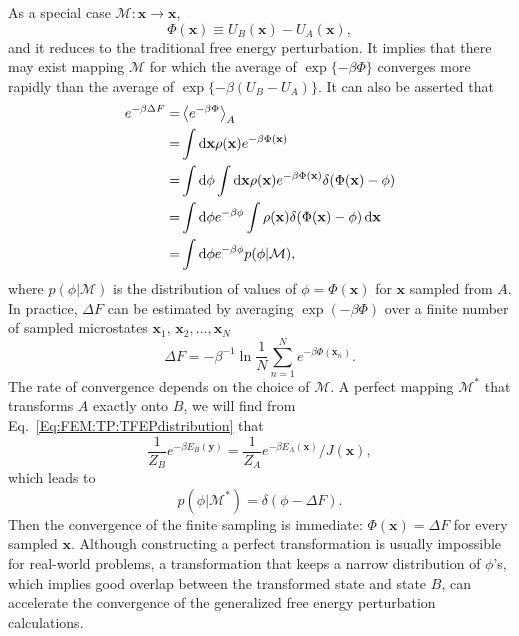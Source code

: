 As a special case $\mathcal{M}: \mathbf{x} \to\mathbf{x}$,
\begin{equation}
	\Phi(\mathbf{x})\equiv U_B(\mathbf{x})-U_A(\mathbf{x}),
\end{equation}
and it reduces to the traditional free energy perturbation. It implies that there may exist mapping $\mathcal{M}$ for which the average of $\exp\{-\beta \Phi\}$ converges more rapidly than the average of $\exp\{-\beta (U_B-U_A)\}$. It can also be asserted that
\begin{align}
	e^{-\beta \Delta F}=&\left<e^{-\beta \Phi}\right>_A\notag\\
	                =&\int \mathop{}\!\mathrm{d} \mathbf{x} \rho(\mathbf{x})e^{-\beta \Phi(\mathbf{x})}\notag\\
	                =&\int \mathop{}\!\mathrm{d}\phi \int \mathop{}\!\mathrm{d} \mathbf{x} \rho(\mathbf{x})e^{-\beta \Phi(\mathbf{x})}\delta(\Phi(\mathbf{x})-\phi)\notag\\
	                =&\int \mathop{}\!\mathrm{d}\phi e^{-\beta \phi}\int \rho(\mathbf{x})\delta(\Phi(\mathbf{x})-\phi)\mathop{}\!\mathrm{d} \mathbf{x}\notag\\
	                =&\int \mathop{}\!\mathrm{d}\phi e^{-\beta \phi} p(\phi|\mathcal{M}),
\end{align}
where $p(\phi|\mathcal{M})$ is the distribution of values of $\phi=\Phi(\mathbf{x})$ for $\mathbf{x}$ sampled from $A$. In practice, $\Delta F$ can be estimated by averaging $\exp{(-\beta \Phi)}$ over a finite number of sampled microstates $\mathbf{x}_1,\,\mathbf{x}_2,\dots,\mathbf{x}_N$
\begin{equation}
	\Delta F=-\beta^{-1}\ln\frac{1}{N}\sum_{n=1}^N e^{-\beta \Phi(\mathbf{x}_n)}.
\end{equation}
The rate of convergence depends on the choice of $\mathcal{M}$. A perfect mapping $\mathcal{M}^\ast$ that transforms $A$ exactly onto $B$, we will find from Eq.~\ref{Eq:FEM:TP:TFEPdistribution} that
\begin{equation}
	\frac{1}{Z_B}e^{-\beta E_B(\mathbf{y})}=\frac{1}{Z_A}e^{-\beta E_A(\mathbf{x})}/J(\mathbf{x}),
\end{equation}
which leads to
\begin{equation}
	p(\phi|\mathcal{M}^\ast)=\delta (\phi-\Delta F).
\end{equation}
Then the convergence of the finite sampling is immediate: $\Phi(\mathbf{x})=\Delta F$ for every sampled $\mathbf{x}$. Although constructing a perfect transformation is usually impossible for real-world problems, a transformation that keeps a narrow distribution of $\phi$'s, which implies good overlap between the transformed state and state $B$, can accelerate the convergence of the generalized free energy perturbation calculations.

